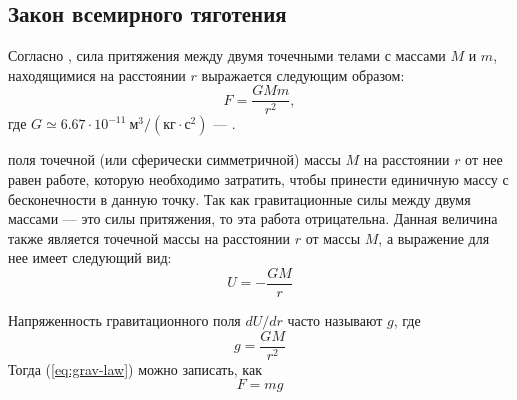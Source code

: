 \subsection{Закон всемирного тяготения}
Согласно , сила притяжения 
между двумя точечными телами с массами $M$ и $m$,
находящимися на расстоянии $r$ выражается следующим
образом:\begin{equation}
	F=\frac{GMm}{r^2}, \label{eq:grav-law}
\end{equation}
где $G\simeq 6.67\cdot 10^{-11}~\text{м}^3 / 
\left( \text{кг} \cdot \text{с}^2 \right)$ --- 
.

 поля точечной (или сферически 
симметричной) массы $M$ на расстоянии $r$ от нее равен
работе, которую необходимо затратить, чтобы принести
единичную массу с бесконечности в данную точку. Так как
гравитационные силы между двумя массами --- это силы 
притяжения, то эта работа отрицательна. Данная
величина также является  точечной
массы на расстоянии $r$ от массы $M$, а выражение для нее имеет 
следующий вид:\begin{equation}
U=-\frac{GM}{r}
\end{equation}

Напряженность гравитационного поля $dU/dr$ часто называют 
 $g$, где\begin{equation}
	g = \frac{GM}{r^2}
\end{equation}
Тогда (\ref{eq:grav-law}) можно записать, как \begin{equation}
	F = mg
\end{equation}
